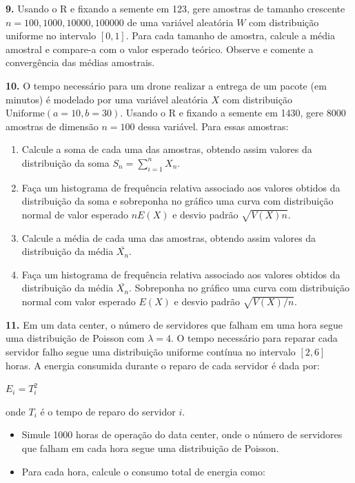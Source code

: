 \documentclass[
]{book}
\begin{document}
\textbf{9.} Usando o R e fixando a semente em 123, gere amostras de tamanho
crescente \(n = 100, 1000, 10000, 100000\) de uma variável aleatória \(W\) com
distribuição uniforme no intervalo \([0, 1]\). Para cada tamanho de
amostra, calcule a média amostral e compare-a com o valor esperado
teórico. Observe e comente a convergência das médias amostrais.

\textbf{10.} O tempo necessário para um drone realizar a entrega de um pacote (em minutos) é modelado por uma variável aleatória \(X\) com distribuição \(\text{Uniforme}(a=10, b=30)\). Usando o R e fixando a semente em 1430, gere 8000 amostras de dimensão \(n=100\) dessa variável. Para essas amostras:

\begin{enumerate}
\def\labelenumi{(\alph{enumi})}
\item
  Calcule a soma de cada uma das amostras, obtendo assim valores da distribuição da soma \(S_{n} = \sum_{i=1}^{n}X_{n}\).
\item
  Faça um histograma de frequência relativa associado aos valores obtidos da distribuição da soma e sobreponha no gráfico uma curva com distribuição normal de valor esperado \(nE(X)\) e desvio padrão \(\sqrt{V(X)n}\).
\item
  Calcule a média de cada uma das amostras, obtendo assim valores da distribuição da média \(\bar{X_{n}}\).
\item
  Faça um histograma de frequência relativa associado aos valores obtidos da distribuição da média \(\bar{X_{n}}\). Sobreponha no gráfico uma curva com distribuição normal com valor esperado \(E(X)\) e desvio padrão \(\sqrt{V(X)/n}\).
\end{enumerate}

\textbf{11.} Em um data center, o número de servidores que falham em uma hora segue uma distribuição de Poisson com \(\lambda = 4\). O tempo necessário para reparar cada servidor falho segue uma distribuição uniforme contínua no intervalo \([2, 6]\) horas. A energia consumida durante o reparo de cada servidor é dada por:

\(E_i = T_i^2\)

onde \(T_i\) é o tempo de reparo do servidor \(i\).

\begin{itemize}
\item
  Simule 1000 horas de operação do data center, onde o número de servidores que falham em cada hora segue uma distribuição de Poisson.
\item
  Para cada hora, calcule o consumo total de energia como:
\end{itemize}
\end{document}
